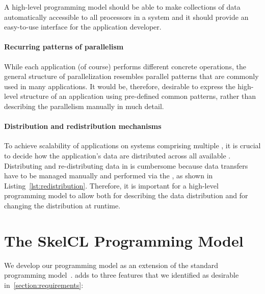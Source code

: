 A high-level programming model should be able to make collections of data automatically accessible to all processors in a system and it should provide an easy-to-use interface for the application developer.

\paragraph{Recurring patterns of parallelism}
While each application (of course) performs different concrete operations, the general structure of parallelization resembles parallel patterns that are commonly used in many applications.
It would be, therefore, desirable to express the high-level structure of an application using pre-defined common patterns, rather than describing the parallelism manually in much detail.

\paragraph{Distribution and redistribution mechanisms}
To achieve scalability of applications on systems comprising multiple \GPUs, it is crucial to decide how the application's data are distributed across all available \GPUs.
Distributing and re-distributing data in \OpenCL is cumbersome because data transfers have to be managed manually and performed via the \CPU, as shown in Listing~\ref{lst:redistribution}.
Therefore, it is important for a high-level programming model to allow both for describing the data distribution and for changing the distribution at runtime.


\section{The SkelCL Programming Model}
\label{section:skelcl-programming-model}
We develop our \SkelCL programming model as an extension of the standard \OpenCL programming model~\cite{OpenCL}.
\SkelCL adds to \OpenCL three features that we identified as desirable in~\autoref{section:requirements}:

